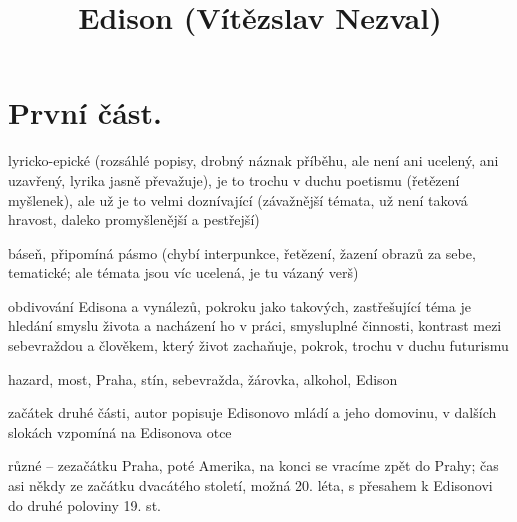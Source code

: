 \documentclass{article}
\title{\vspace{-2cm}Edison (Vítězslav Nezval)\vspace{-2cm}}
\date{}
\author{}
\begin{document}
\maketitle
\section{První část.}
\begin{description}
    \setlength\itemsep{0.15em}
    \item[druh:] lyricko-epické (rozsáhlé popisy, drobný náznak příběhu, ale není ani ucelený, ani uzavřený, lyrika jasně převažuje), je to trochu v duchu poetismu (řetězení myšlenek), ale už je to velmi doznívající (závažnější témata, už není taková hravost, daleko promyšlenější a pestřejší)
    \item[žánr:] báseň, připomíná pásmo (chybí interpunkce, řetězení, žazení obrazů za sebe, tematické; ale témata jsou víc ucelená, je tu vázaný verš)
    \item[téma:] obdivování Edisona a vynálezů, pokroku jako takových, zastřešující téma je hledání smyslu života a nacházení ho v práci, smysluplné činnosti, kontrast mezi sebevraždou a člověkem, který život zachaňuje, pokrok, trochu v duchu futurismu
    \item[motivy:] hazard, most, Praha, stín, sebevražda, žárovka, alkohol, Edison
    \item[zařazení výňatku do kontextu díla:] začátek druhé části, autor popisuje Edisonovo mládí a jeho domovinu, v dalších slokách vzpomíná na Edisonova otce
    \item[časoprostor:] různé -- zezačátku Praha, poté Amerika, na konci se vracíme zpět do Prahy; čas asi někdy ze začátku dvacátého století, možná 20. léta, s přesahem k Edisonovi do druhé poloviny 19. st.

\end{description}
\end{document}
